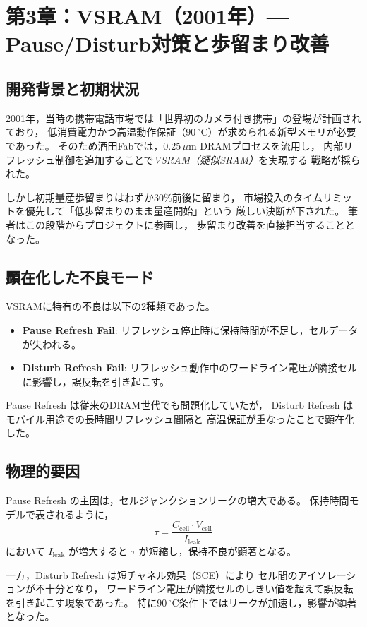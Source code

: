 \documentclass[conference]{IEEEtran}
\begin{document}
\section{第3章：VSRAM（2001年）— Pause/Disturb対策と歩留まり改善}

\subsection{開発背景と初期状況}
2001年，当時の携帯電話市場では「世界初のカメラ付き携帯」の登場が計画されており，
低消費電力かつ高温動作保証（90\,$^\circ$C）が求められる新型メモリが必要であった。
そのため酒田Fabでは，0.25\,$\mu$m DRAMプロセスを流用し，
内部リフレッシュ制御を追加することで\emph{VSRAM（疑似SRAM）}を実現する
戦略が採られた。

しかし初期量産歩留まりはわずか30\%前後に留まり，
市場投入のタイムリミットを優先して「低歩留まりのまま量産開始」という
厳しい決断が下された。
筆者はこの段階からプロジェクトに参画し，
歩留まり改善を直接担当することとなった。

\subsection{顕在化した不良モード}
VSRAMに特有の不良は以下の2種類であった。
\begin{itemize}
  \item \textbf{Pause Refresh Fail}: リフレッシュ停止時に保持時間が不足し，セルデータが失われる。
  \item \textbf{Disturb Refresh Fail}: リフレッシュ動作中のワードライン電圧が隣接セルに影響し，誤反転を引き起こす。
\end{itemize}

Pause Refresh は従来のDRAM世代でも問題化していたが，
Disturb Refresh はモバイル用途での長時間リフレッシュ間隔と
高温保証が重なったことで顕在化した。

\subsection{物理的要因}
Pause Refresh の主因は，セルジャンクションリークの増大である。
保持時間モデルで表されるように，
\[
\tau = \frac{C_{\mathrm{cell}} \cdot V_{\mathrm{cell}}}{I_{\mathrm{leak}}}
\]
において $I_{\mathrm{leak}}$ が増大すると $\tau$ が短縮し，保持不良が顕著となる。

一方，Disturb Refresh は短チャネル効果（SCE）により
セル間のアイソレーションが不十分となり，
ワードライン電圧が隣接セルのしきい値を超えて誤反転を引き起こす現象であった。
特に90\,$^\circ$C条件下ではリークが加速し，影響が顕著となった。
\end{document}
